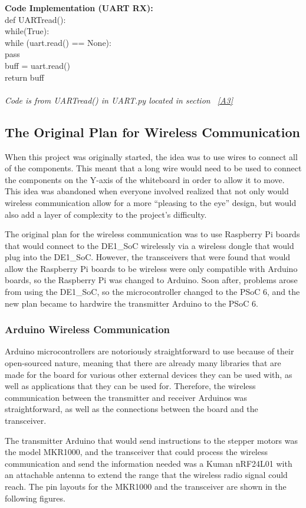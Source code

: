 \noindent \textbf{Code Implementation (UART RX):}\\ 
def UARTread():\\
  while(True):\\
    while (uart.read() == None):\\
      pass\\
    buff = uart.read()\\
    return buff\\\\
\textit{Code is from UARTread() in UART.py located in section  ~\ref{A3}}\\

\subsection{The Original Plan for Wireless Communication}

When this project was originally started, the idea was to use wires to connect all of the components. This meant that a long wire would need to be used to connect the components on the Y-axis of the whiteboard in order to allow it to move. This idea was abandoned when everyone involved realized that not only would wireless communication allow for a more “pleasing to the eye” design, but would also add a layer of complexity to the project’s difficulty. \par
\setlength{\parindent}{2.5ex}
The original plan for the wireless communication was to use Raspberry Pi boards that would connect to the DE1\_SoC wirelessly via a wireless dongle that would plug into the DE1\_SoC. However, the transceivers that were found that would allow the Raspberry Pi boards to be wireless were only compatible with Arduino boards, so the Raspberry Pi was changed to Arduino. Soon after, problems arose from using the DE1\_SoC, so the microcontroller changed to the PSoC 6, and the new plan became to hardwire the transmitter Arduino to the PSoC 6. \\

\subsubsection{Arduino Wireless Communication}

Arduino microcontrollers are notoriously straightforward to use because of their open-sourced nature, meaning that there are already many libraries that are made for the board for various other external devices they can be used with, as well as applications that they can be used for. Therefore, the wireless communication between the transmitter and receiver Arduinos was straightforward, as well as the connections between the board and the transceiver. \par
\setlength{\parindent}{2.5ex}
The transmitter Arduino that would send instructions to the stepper motors was the model MKR1000, and the transceiver that could process the wireless communication and send the information needed was a Kuman nRF24L01 with an attachable antenna to extend the range that the wireless radio signal could reach. The pin layouts for the MKR1000 and the transceiver are shown in the following figures.

